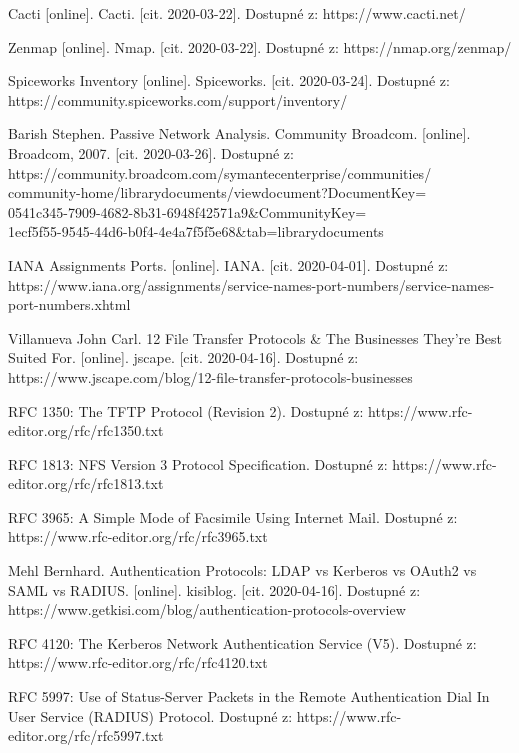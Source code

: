 \documentclass[thesis=B,czech,hidelinks]{FITthesis}[2019/03/21]
\begin{document}
\begin{thebibliography}{99}
     Cacti [online]. Cacti. [cit. 2020-03-22]. Dostupné z: https://www.cacti.net/
    
     Zenmap [online]. Nmap. [cit. 2020-03-22]. Dostupné z: https://nmap.org/zenmap/
    
     Spiceworks Inventory [online]. Spiceworks. [cit. 2020-03-24]. Dostupné z: https://community.spiceworks.com/support/inventory/
    
     Barish Stephen. Passive Network Analysis. Community Broadcom. [online]. Broadcom, 2007. [cit. 2020-03-26]. Dostupné z: https://community.broadcom.com/symantecenterprise/communities/\\community-home/librarydocuments/viewdocument?DocumentKey=\\0541c345-7909-4682-8b31-6948f42571a9\&CommunityKey=\\1ecf5f55-9545-44d6-b0f4-4e4a7f5f5e68\&tab=librarydocuments
    
     IANA Assignments Ports. [online]. IANA. [cit. 2020-04-01]. Dostupné z: https://www.iana.org/assignments/service-names-port-numbers/service-names-port-numbers.xhtml
    
    
      Villanueva John Carl. 12 File Transfer Protocols \& The Businesses They're Best Suited For. [online]. jscape. [cit. 2020-04-16]. Dostupné z: https://www.jscape.com/blog/12-file-transfer-protocols-businesses
    
      RFC 1350: The TFTP Protocol (Revision 2). Dostupné
z: https://www.rfc-editor.org/rfc/rfc1350.txt

       RFC 1813: NFS Version 3 Protocol Specification. Dostupné
z: https://www.rfc-editor.org/rfc/rfc1813.txt
    
     RFC 3965: A Simple Mode of Facsimile Using Internet Mail. Dostupné
z: https://www.rfc-editor.org/rfc/rfc3965.txt
    
      Mehl Bernhard. Authentication Protocols: LDAP vs Kerberos vs OAuth2 vs SAML vs RADIUS. [online]. kisiblog. [cit. 2020-04-16]. Dostupné z: https://www.getkisi.com/blog/authentication-protocols-overview
    
     RFC 4120: The Kerberos Network Authentication Service (V5). Dostupné
z: https://www.rfc-editor.org/rfc/rfc4120.txt
    
     RFC 5997: Use of Status-Server Packets in the Remote Authentication Dial In User Service (RADIUS) Protocol. Dostupné
z: https://www.rfc-editor.org/rfc/rfc5997.txt
    

\end{thebibliography}
\end{document}
